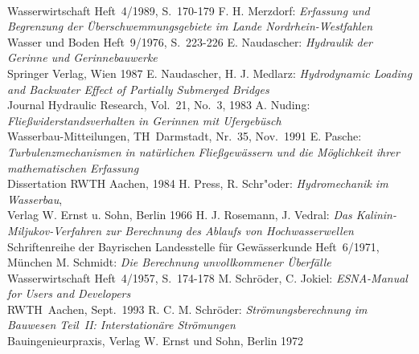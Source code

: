 \begin{thebibliography}{99}
                                 \\ Wasserwirtschaft Heft~4/1989, S.~170-179
               F. H. Merzdorf: \emph{Erfassung und Begrenzung der \"{U}berschwemmungsgebiete im Lande
                                 Nordrhein-Westfahlen}
                                 \\ Wasser und Boden Heft~9/1976, S.~223-226
             E. Naudascher: \emph{Hydraulik der Gerinne und Gerinnebauwerke}
                                 \\ Springer Verlag, Wien 1987
        E. Naudascher, H. J. Medlarz: \emph{Hydrodynamic Loading and Backwater Effect of Partially
                                 Submerged Bridges}
                                 \\ Journal Hydraulic Research, Vol.~21, No.~3, 1983
                 A. Nuding: \emph{Flie{\ss}widerstandsverhalten in Gerinnen mit Ufergeb\"{u}sch}
                                 \\ Wasserbau-Mitteilungen, TH~Darmstadt, Nr.~35, Nov.~1991
                 E. Pasche: \emph{Turbulenzmechanismen in nat\"{u}rlichen Flie{\ss}gew\"{a}ssern und die M\"{o}glichkeit
                                 ihrer mathematischen Erfassung}
                                 \\ Dissertation RWTH Aachen, 1984
         H. Press, R. Schr"oder: \emph{Hydromechanik im Wasserbau},
                                 \\ Verlag W. Ernst u. Sohn, Berlin 1966
         H. J. Rosemann, J. Vedral: \emph{Das Kalinin-Miljukov-Verfahren zur Berechnung des
                                 Ablaufs von Hochwasserwellen}
                                 \\ Schriftenreihe der Bayrischen Landesstelle f\"{u}r Gew\"{a}sserkunde Heft~6/1971, M\"{u}nchen
                M. Schmidt: \emph{Die Berechnung unvollkommener \"{U}berf\"{a}lle}
                                 \\ Wasserwirtschaft Heft~4/1957, S.~174-178
        M. Schr\"{o}der, C. Jokiel: \emph{ESNA-Manual for Users and Developers}
                                 \\ RWTH~Aachen, Sept.~1993
          R. C. M. Schr\"{o}der: \emph{Str\"{o}mungsberechnung im Bauwesen Teil~II: Interstation\"{a}re Str\"{o}mungen}
                                 \\ Bauingenieurpraxis, Verlag W. Ernst und Sohn, Berlin 1972

\end{thebibliography}
